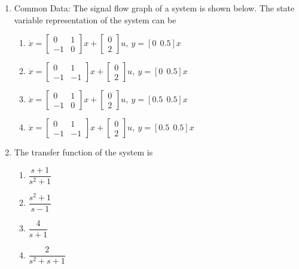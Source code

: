 \documentclass[journal,12pt,onecolumn]{IEEEtran}
\begin{document}
\begin{enumerate}
\item Common Data: The signal flow graph of a system is shown below. The state variable representation of the system can be
\begin{multicols}{2}
\begin{enumerate}
\item $ \dot{x}=\begin{bmatrix}0&1\\ -1&0\end{bmatrix}x+\begin{bmatrix}0\\2\end{bmatrix}u, \ y=[0\ \ 0.5]x $
\item $ \dot{x}=\begin{bmatrix}0&1\\ -1&-1\end{bmatrix}x+\begin{bmatrix}0\\2\end{bmatrix}u, \ y=[0\ \ 0.5]x $
\item $ \dot{x}=\begin{bmatrix}0&1\\ -1&0\end{bmatrix}x+\begin{bmatrix}0\\2\end{bmatrix}u, \ y=[0.5\ \ 0.5]x $
\item $ \dot{x}=\begin{bmatrix}0&1\\ -1&-1\end{bmatrix}x+\begin{bmatrix}0\\2\end{bmatrix}u, \ y=[0.5\ \ 0.5]x $
\end{enumerate}
\end{multicols}

\item The transfer function of the system is
\begin{multicols}{2}
\begin{enumerate}
\item $\dfrac{s+1}{s^2+1}$
\item $\dfrac{s^2+1}{s-1}$
\item $\dfrac{4}{s+1}$
\item $\dfrac{2}{s^2+s+1}$
\end{enumerate}
\end{multicols}


\end{enumerate}
\end{document}
